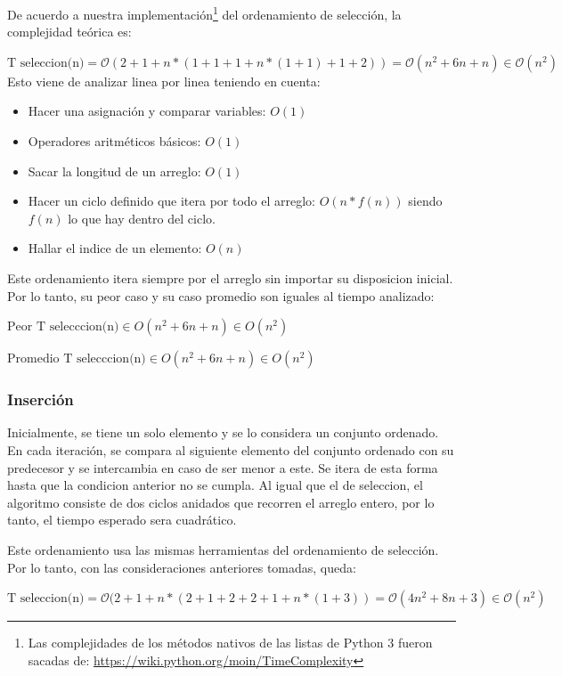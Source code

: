\documentclass[article,a4paper]{article}
\begin{document}
De acuerdo a nuestra implementación\footnote{Las complejidades de los métodos nativos de las listas de Python 3 fueron sacadas de: \url{https://wiki.python.org/moin/TimeComplexity}} del ordenamiento de selección, la complejidad teórica es:

$\mbox{T seleccion(n)} = \mathcal O(2 + 1 + n * (1 + 1 + 1 + n * (1 + 1) + 1 + 2)) = \mathcal O(n^2 + 6n + n) \in \mathcal O(n^2)$\\

Esto viene de analizar linea por linea teniendo en cuenta:
\begin{itemize}
\item Hacer una asignación y comparar variables: $O(1)$
\item Operadores aritméticos básicos: $O(1)$
\item Sacar la longitud de un arreglo: $O(1)$
\item Hacer un ciclo definido que itera por todo el arreglo: $O(n * f(n))$ siendo $f(n)$ lo que hay dentro del ciclo.
\item Hallar el indice de un elemento: $O(n)$
\end{itemize}

Este ordenamiento itera siempre por el arreglo sin importar su disposicion inicial. Por lo tanto, su peor caso y su caso promedio son iguales al tiempo analizado:

$\mbox{Peor T selecccion(n)} \in O(n^2 + 6n + n) \in O(n^2)$ 

$\mbox{Promedio T selecccion(n)}  \in O(n^2 + 6n + n) \in O(n^2)$


\subsubsection{Inserción}

Inicialmente, se tiene un solo elemento y se lo considera un conjunto ordenado. En cada iteración, se compara al siguiente elemento del conjunto ordenado con su predecesor y se intercambia en caso de ser menor a este. Se itera de esta forma hasta que la condicion anterior no se cumpla. Al igual que el de seleccion, el algoritmo consiste de dos ciclos anidados que recorren el arreglo entero, por lo tanto, el tiempo esperado sera cuadrático.

Este ordenamiento usa las mismas herramientas del ordenamiento de selección. Por lo tanto, con las consideraciones anteriores tomadas, queda:

$\mbox{T seleccion(n)} = \mathcal O( 2 + 1 + n * (2 + 1 + 2 + 2 + 1 + n * (1 + 3)) = \mathcal O(4n^2 + 8n + 3) \in \mathcal O(n^2)$
\end{document}
